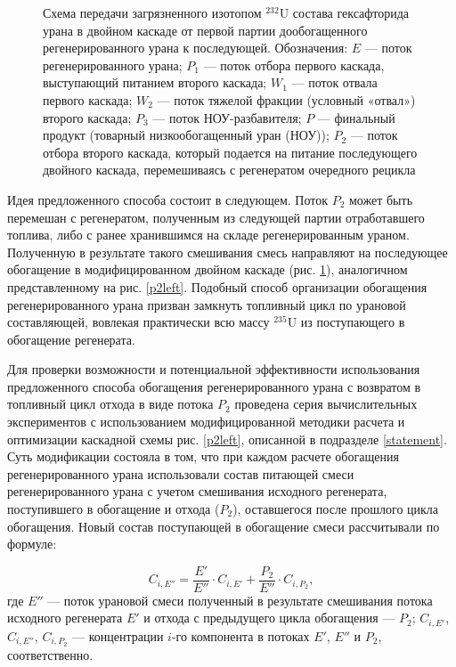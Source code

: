 \begin{figure}[ht]
    \caption{Схема передачи загрязненного изотопом $^{232}$U состава гексафторида урана в двойном каскаде от первой партии дообогащенного регенерированного урана к последующей. Обозначения: $E$ --- поток регенерированного урана; $P_1$ --- поток отбора первого каскада, выступающий питанием второго каскада; $W_1$ --- поток отвала первого каскада; $W_2$ --- поток тяжелой фракции (условный «отвал») второго каскада; $P_3$ --- поток НОУ-разбавителя; $P$ --- финальный продукт (товарный низкообогащенный уран (НОУ)); $P_2$ --- поток отбора второго каскада, который подается на питание последующего двойного каскада, перемешиваясь с регенератом очередного рецикла}\label{P2utilizationRing}
\end{figure}

Идея предложенного способа состоит в следующем. Поток $P_2$ может быть перемешан с регенератом, полученным из следующей партии отработавшего топлива, либо с ранее хранившимся на складе регенерированным ураном. Полученную в результате такого смешивания смесь направляют на последующее обогащение в модифицированном двойном каскаде (рис. \ref{P2utilizationRing}), аналогичном представленному на рис. \ref{p2left}. Подобный способ организации обогащения регенерированного урана призван замкнуть топливный цикл по урановой составляющей, вовлекая практически всю массу $^{235}$U из поступающего в обогащение регенерата.

Для проверки возможности и потенциальной эффективности использования предложенного способа обогащения регенерированного урана с возвратом в топливный цикл отхода в виде потока $P_2$ проведена серия вычислительных экспериментов с использованием модифицированной методики расчета и оптимизации каскадной схемы рис. \ref{p2left}, описанной в подразделе \ref{statement}. Суть модификации состояла в том, что при каждом расчете обогащения регенерированного урана использовали состав питающей смеси регенерированного урана с учетом смешивания исходного регенерата, поступившего в обогащение и отхода ($P_2$), оставшегося после прошлого цикла обогащения. Новый состав поступающей в обогащение смеси рассчитывали по формуле:

\begin{equation} \label{Cie} 
    C_{i,E''}=\frac{E'}{E''} \cdot {C_{i,{E'}}} + \frac{P_2}{E''} \cdot {C_{i,{P_2}}},
\end{equation}
где $E''$ --- поток урановой смеси полученный в результате смешивания потока исходного регенерата $E'$ и отхода с предыдущего цикла обогащения --- $P_2$; $C_{i,E'}$, $C_{i,E''}$, $C_{i,{P_2}}$ --- концентрации $i$-го компонента в потоках $E'$, $E''$ и $P_2$, соответственно.     

